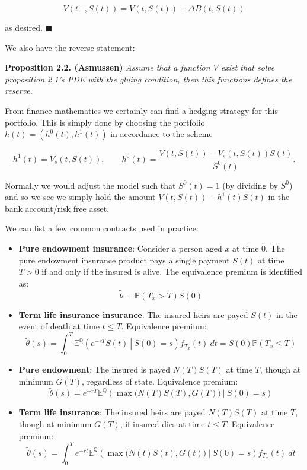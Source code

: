 \documentclass[a4paper,12pt,openany]{book}
\providecommand{\tightlist}{%
 \setlength{\itemsep}{0pt}\setlength{\parskip}{0pt}}
\begin{document}
\[
V(t-,S(t))=V(t,S(t))+\Delta B(t,S(t))
\]

as desired. \(\blacksquare\)

We also have the reverse statement:

\textbf{Proposition 2.2. (Asmussen)} \emph{Assume that a function \(V\) exist that solve proposition 2.1's PDE with the gluing condition, then this functions defines the reserve.}

From finance mathematics we certainly can find a hedging strategy for this portfolio. This is simply done by choosing the portfolio \(h(t)=(h^0(t),h^1(t))\) in accordance to the scheme

\[
h^1(t)=V_s(t,S(t)),\qquad h^0(t)=\frac{V(t,S(t))-V_s(t,S(t))S(t)}{S^0(t)}.
\]

Normally we would adjust the model such that \(S^0(t)=1\) (by dividing by \(S^0\)) and so we see we simply hold the amount \(V(t,S(t))-h^1(t)S(t)\) in the bank account/risk free asset.

We can list a few common contracts used in practice:

\begin{itemize}
\tightlist
\item
  \textbf{Pure endowment insurance}: Consider a person aged \(x\) at time \(0\). The pure endowment insurance product pays a single payment \(S(t)\) at time \(T>0\) if and only if the insured is alive. The equivalence premium is identified as:
  \[\tilde\theta =\mathbb P(T_x> T)S(0)\]
\item
  \textbf{Term life insurance insurance}: The insured heirs are payed \(S(t)\) in the event of death at time \(t\le T\). Equivalence premium:
  \[\tilde\theta(s) =\int_0^T\mathbb E^{\mathbb Q}\left(\left.e^{-rT}S(t)\ \right\vert\ S(0)=s\right)f_{T_x}(t)\ dt=S(0)\mathbb P(T_x\le T)\]
\item
  \textbf{Pure endowment}: The insured is payed \(N(T)S(T)\) at time \(T\), though at minimum \(G(T)\), regardless of state. Equivalence premium:
  \[\tilde\theta(s) =e^{-rT}\mathbb E^{\mathbb Q}\left(\left.\max\Big(N(T)S(T),G(T)\Big) \ \right\vert\ S(0)=s\right)\]
\item
  \textbf{Term life insurance}: The insured heirs are payed \(N(T)S(T)\) at time \(T\), though at minimum \(G(T)\), if insured dies at time \(t\le T\). Equivalence premium:
  \[\tilde\theta(s) =\int_0^Te^{-rt}\mathbb E^{\mathbb Q}\left(\left.\max\Big(N(t)S(t),G(t)\Big) \ \right\vert\ S(0)=s\right)f_{T_x}(t)\ dt\]
\end{itemize}
\end{document}
